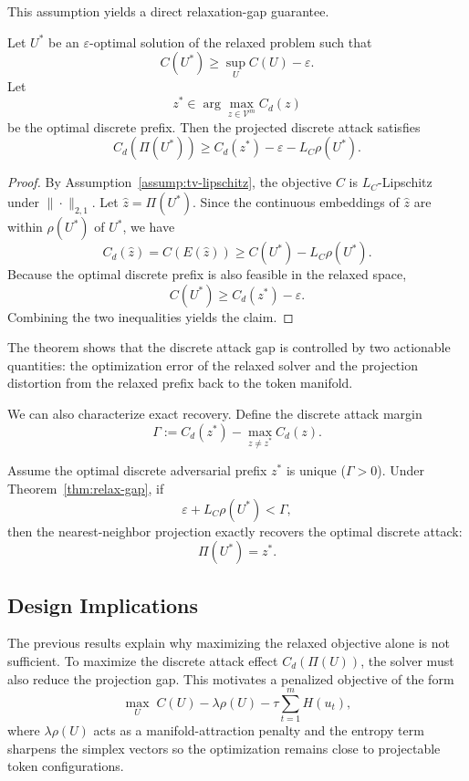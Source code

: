 This assumption yields a direct relaxation-gap guarantee.

\begin{theorem}
\label{thm:relax-gap}
Let $U^*$ be an $\varepsilon$-optimal solution of the relaxed problem such that
\[
C(U^*) \ge \sup_U C(U) - \varepsilon.
\]
Let
\[
z^* \in \arg\max_{z \in \mathcal{V}^m} C_d(z)
\]
be the optimal discrete prefix. Then the projected discrete attack satisfies
\[
C_d(\Pi(U^*)) \ge C_d(z^*) - \varepsilon - L_C \rho(U^*).
\]
\end{theorem}

\begin{proof}
By Assumption~\ref{assump:tv-lipschitz}, the objective $C$ is $L_C$-Lipschitz
under $\|\cdot\|_{2,1}$. Let $\hat{z} = \Pi(U^*)$. Since the continuous
embeddings of $\hat{z}$ are within $\rho(U^*)$ of $U^*$, we have
\[
C_d(\hat{z}) = C(E(\hat{z})) \ge C(U^*) - L_C \rho(U^*).
\]
Because the optimal discrete prefix is also feasible in the relaxed space,
\[
C(U^*) \ge C_d(z^*) - \varepsilon.
\]
Combining the two inequalities yields the claim.
\end{proof}

The theorem shows that the discrete attack gap is controlled by two actionable
quantities: the optimization error of the relaxed solver and the projection
distortion from the relaxed prefix back to the token manifold.

We can also characterize exact recovery. Define the discrete attack margin
\[
\Gamma := C_d(z^*) - \max_{z \neq z^*} C_d(z).
\]

\begin{corollary}
\label{cor:exact-recovery}
Assume the optimal discrete adversarial prefix $z^*$ is unique
($\Gamma > 0$). Under Theorem~\ref{thm:relax-gap}, if
\[
\varepsilon + L_C \rho(U^*) < \Gamma,
\]
then the nearest-neighbor projection exactly recovers the optimal discrete
attack:
\[
\Pi(U^*) = z^*.
\]
\end{corollary}

\subsection{Design Implications}

The previous results explain why maximizing the relaxed objective alone is not
sufficient. To maximize the discrete attack effect $C_d(\Pi(U))$, the solver
must also reduce the projection gap. This motivates a penalized objective of
the form
\[
\max_U \; C(U) - \lambda \rho(U) - \tau \sum_{t=1}^{m} H(u_t),
\]
where $\lambda \rho(U)$ acts as a manifold-attraction penalty and the entropy
term sharpens the simplex vectors so the optimization remains close to
projectable token configurations.


